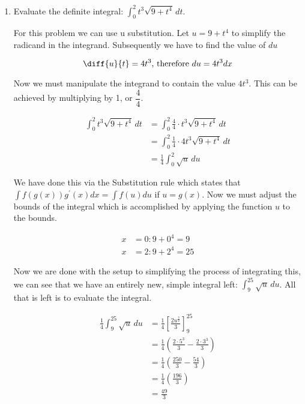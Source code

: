 \documentclass{article}
\begin{document}
\begin{enumerate}[label=\textbf{(3.\arabic*)}] %

\item Evaluate the definite integral: $\displaystyle{ \int_0^2\! t^3\sqrt{9+t^4}\, dt }$.

For this problem we can use u substitution. Let $u=9+t^4$ to simplify the radicand in the integrand. Subsequently we have to find the value of $du$

\[\diff{u}{t}=4t^3\text{, therefore } du=4t^3dx\]

Now we must manipulate the integrand to contain the value $4t^3$. This can be achieved by multiplying by 1, or $\dfrac{4}{4}$.

\begin{align*}
\int_0^2\!t^3\sqrt{9+t^4}\,dt&=\int_0^2\!\frac{4}{4}\cdot t^3\sqrt{9+t^4}\, dt \\
&=\int_0^2\!\frac{1}{4}\cdot 4t^3\sqrt{9+t^4}\, dt \\
&=\frac{1}{4}\int_0^2\!\sqrt{u}\, du
\end{align*}

We have done this via the Substitution rule which states that $\displaystyle{\int f\left(g\left(x\right)\right)g^\prime(x)dx = \int f(u)du }$ if $u=g(x)$. Now we must adjust the bounds of the integral which is accomplished by applying the function $u$ to the bounds.

\begin{align*}
x&=0: 9+0^4=9 \\
x&=2: 9+2^4=25
\end{align*}

Now we are done with the setup to simplifying the process of integrating this, we can see that we have an entirely new, simple integral left: $\displaystyle{ \int_9^{25}\! \sqrt{u}\,du}$. All that is left is to evaluate the integral.

\begin{align*}
\frac{1}{4}\int_9^{25}\!\sqrt{u}\,du&=\frac{1}{4}\left[\frac{2u^\frac{3}{2}}{3}\right]_9^{25} \\
&=\frac{1}{4}\left(\frac{2\cdot5^3}{3}-\frac{2\cdot3^3}{3}\right) \\
&=\frac{1}{4}\left(\frac{250}{3}-\frac{54}{3}\right) \\
&=\frac{1}{4}\left(\frac{196}{3}\right) \\
&=\frac{49}{3}
\end{align*}


\end{enumerate}
\end{document}
